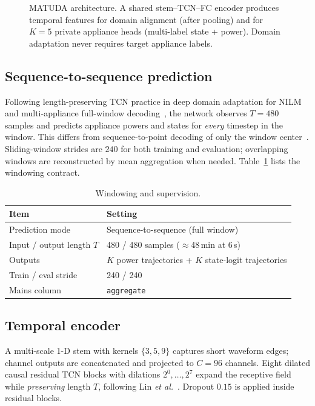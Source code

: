\documentclass[journal]{IEEEtran}
\begin{document}
\begin{figure}[!t]
\caption{MATUDA architecture. A shared stem--TCN--FC encoder produces temporal features for domain alignment (after pooling) and for $K{=}5$ private appliance heads (multi-label state + power). Domain adaptation never requires target appliance labels.}
\label{fig:arch}
\end{figure}

\subsection{Sequence-to-sequence prediction}
Following length-preserving TCN practice in deep domain adaptation for NILM~\cite{lin2022dda} and multi-appliance full-window decoding~\cite{xiong2023matnilm}, the network observes $T{=}480$ samples and predicts appliance powers and states for \emph{every} timestep in the window.
This differs from sequence-to-point decoding of only the window center~\cite{zhang2018seq2point}.
Sliding-window strides are $240$ for both training and evaluation; overlapping windows are reconstructed by mean aggregation when needed.
Table~\ref{tab:window} lists the windowing contract.

\begin{table}[!t]
\caption{Windowing and supervision.}
\label{tab:window}
\centering
\scriptsize
\begin{tabular}{@{}ll@{}}
\toprule
Item & Setting \\
\midrule
Prediction mode & Sequence-to-sequence (full window) \\
Input / output length $T$ & 480 / 480 samples ($\approx$48\,min at 6\,s) \\
Outputs & $K$ power trajectories + $K$ state-logit trajectories \\
Train / eval stride & 240 / 240 \\
Mains column & \texttt{aggregate} \\
\bottomrule
\end{tabular}
\end{table}

\subsection{Temporal encoder}
A multi-scale 1-D stem with kernels $\{3,5,9\}$ captures short waveform edges; channel outputs are concatenated and projected to $C{=}96$ channels.
Eight dilated causal residual TCN blocks with dilations $2^{0},\ldots,2^{7}$ expand the receptive field while \emph{preserving} length $T$, following Lin \emph{et al.}~\cite{lin2022dda}.
Dropout $0.15$ is applied inside residual blocks.
\end{document}
